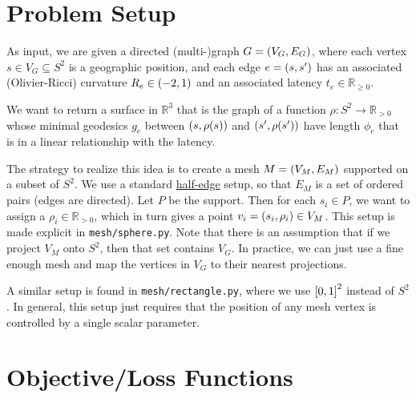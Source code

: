 \documentclass[10pt]{article}
\newcommand*\delimeter[3]{
	\ensuremath{\mathopen{}\left#2 #1\right#3\mathclose{}{\vphantom{\left#2 #1\right#3}}}
}
\newcommand*\pof[1]{\delimeter{#1}{(}{)}}
\newcommand*\ooint[1]{\delimeter{#1}{(}{)}}
\newcommand*\ccint[1]{\delimeter{#1}{[}{]}}
\begin{document}
	\pagestyle{empty}

	\section{Problem Setup}

	As input, we are given a directed (multi-)graph \(G = \pof{V_G, E_G}\), where each vertex \(s \in V_G \subseteq S^2\) is a geographic position, and each edge \(e = \pof{s, s'}\) has an associated (Olivier-Ricci) curvature \(R_e \in \ooint{-2, 1}\) and an associated latency \(t_e \in \mathbb{R}_{\ge 0}\).

	We want to return a surface in \(\mathbb{R}^3\) that is the graph of a function \(\rho : S^2 \to \mathbb{R}_{> 0}\) whose minimal geodesics \(g_e\) between \(\pof{s, \rho\pof{s}}\) and \(\pof{s', \rho\pof{s'}}\) have length \(\phi_e\) that is in a linear relationship with the latency.

	The strategy to realize this idea is to create a mesh \(M = \pof{V_M, E_M}\) supported on a subset of \(S^2\). We use a standard \href{https://en.wikipedia.org/wiki/Doubly_connected_edge_list}{half-edge} setup, so that \(E_M\) is a set of ordered pairs (edges are directed). Let \(P\) be the support. Then for each \(s_i \in P\), we want to assign a \(\rho_i \in \mathbb{R}_{> 0}\), which in turn gives a point \(v_i = \pof{s_i, \rho_i} \in V_M\). This setup is made explicit in \texttt{mesh/sphere.py}. Note that there is an assumption that if we project \(V_M\) onto \(S^2\), then that set contains \(V_G\). In practice, we can just use a fine enough mesh and map the vertices in \(V_G\) to their nearest projections.

	A similar setup is found in \texttt{mesh/rectangle.py}, where we use \(\ccint{0, 1}^2\) instead of \(S^2\). In general, this setup just requires that the position of any mesh vertex is controlled by a single scalar parameter.

	\section{Objective/Loss Functions}
\end{document}
